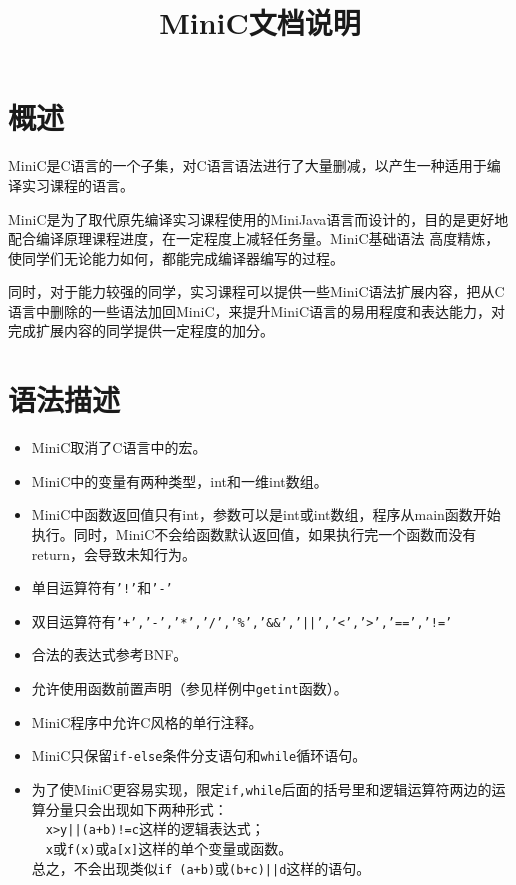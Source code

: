 \documentclass{ctexart}
\title{MiniC文档说明}
\date{}
\author{}
\begin{document}
\maketitle

\section{概述}
MiniC是C语言的一个子集，对C语言语法进行了大量删减，以产生一种适用于编译实习课程的语言。

MiniC是为了取代原先编译实习课程使用的MiniJava语言而设计的，目的是更好地配合编译原理课程进度，在一定程度上减轻任务量。MiniC基础语法%
高度精炼，使同学们无论能力如何，都能完成编译器编写的过程。

同时，对于能力较强的同学，实习课程可以提供一些MiniC语法扩展内容，把从C语言中删除的一些语法加回MiniC，来提升MiniC语言的易用程度和表达能力，对完成扩展内容的同学提供一定程度的加分。

\section{语法描述}
\begin{itemize}
\item 
MiniC取消了C语言中的宏。%
\item 
MiniC中的变量有两种类型，int和一维int数组。%
\item
MiniC中函数返回值只有int，参数可以是int或int数组，程序从main函数开始执行。同时，MiniC不会给函数默认返回值，如果执行完一个函数而没有return，会导致未知行为。

\item 
单目运算符有\texttt{'!'}和\texttt{'-'}
\item
双目运算符有\texttt{'+','-','*','/','\%','\&\&','||','\textless','\textgreater','==','!='}
\item
合法的表达式参考BNF。
\item 
允许使用函数前置声明（参见样例中\texttt{getint}函数）。
\item 
MiniC程序中允许C风格的单行注释。%
\item 
MiniC只保留\texttt{if-else}条件分支语句和\texttt{while}循环语句。
\item 
为了使MiniC更容易实现，限定\texttt{if,while}后面的括号里和逻辑运算符两边的运算分量只会出现如下两种形式：\\
\indent\ \ \texttt{x>y||(a+b)!=c}这样的逻辑表达式；\\
\indent\ \ \texttt{x}或\texttt{f(x)}或\texttt{a[x]}这样的单个变量或函数。\\
\indent 总之，不会出现类似\texttt{if (a+b)}或\texttt{(b+c)||d}这样的语句。
\end{itemize}
\newpage
\end{document}
